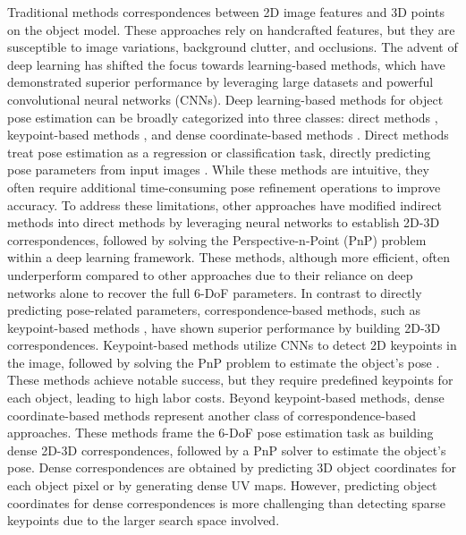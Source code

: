 Traditional methods \DIFdelbegin {}\DIFdelend \DIFaddbegin {}\DIFaddend correspondences between 2D image features and 3D points on the object model. These approaches rely on handcrafted features, but they are susceptible to image variations, background clutter, and occlusions. The advent of deep learning has shifted the focus towards learning-based methods, which have demonstrated superior performance by leveraging large datasets and powerful convolutional neural networks (CNNs). Deep learning-based methods for object pose estimation can be broadly categorized into three classes: direct methods \cite{xiang2017posecnn, kehl2017ssd, trabelsi2021pose, wang2021gdr}, keypoint-based methods \cite{rad2017bb8, tekin2018real, oberweger2018making, peng2019pvnet}, and dense coordinate-based methods \cite{li2019cdpn, park2019pix2pose, zakharov2019dpod}. Direct methods treat pose estimation as a regression or classification task, directly predicting pose parameters from input images \cite{xiang2017posecnn, kehl2017ssd, trabelsi2021pose}. While these methods are intuitive, they often require additional time-consuming pose refinement operations to improve accuracy. To address these limitations, other approaches \cite{hu2020single, chen2020end, wang2021gdr} have modified indirect methods into direct methods by leveraging neural networks to establish 2D-3D correspondences, followed by solving the Perspective-n-Point (PnP) problem \cite{lepetit2009ep} within a deep learning framework. These methods, although more efficient, often underperform compared to other approaches due to their reliance on deep networks alone to recover the full 6-DoF parameters. In contrast to directly predicting pose-related parameters, correspondence-based methods, such as keypoint-based methods \cite{rad2017bb8, tekin2018real, oberweger2018making, peng2019pvnet}, have shown superior performance by building 2D-3D correspondences. Keypoint-based methods utilize CNNs to detect 2D keypoints in the image, followed by solving the PnP problem to estimate the object's pose \cite{lepetit2009ep}. These methods achieve notable success, but they require predefined keypoints for each object, leading to high labor costs. Beyond keypoint-based methods, dense coordinate-based methods \cite{li2019cdpn, park2019pix2pose, zakharov2019dpod} represent another class of correspondence-based approaches. These methods frame the 6-DoF pose estimation task as building dense 2D-3D correspondences, followed by a PnP solver to estimate the object's pose. Dense correspondences are obtained by predicting 3D object coordinates for each object pixel or by generating dense UV maps. However, predicting object coordinates for dense correspondences is more challenging than detecting sparse keypoints due to the larger search space involved.

